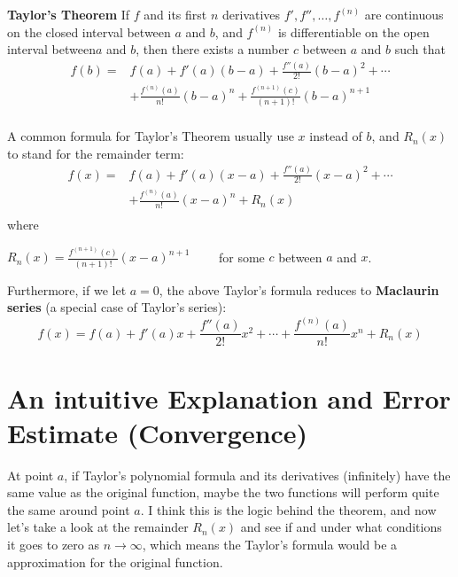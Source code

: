 \documentclass[11pt]{article}
\begin{document}
\begin{tcolorbox}[
	enhanced, 
	width=\textwidth, 
	fontupper=\normalsize,%
	drop fuzzy shadow southwest,
	boxrule=0.4pt,
	sharp corners,
	colframe=yellow!80!black,
	colback=yellow!10]
	
\textbf{\color{RoyalBlue} Taylor's Theorem} If $f$ and its first $n$ derivatives $f', f'',  \dots , f^{(n)}$ are continuous on the closed interval between $a$ and $b$, and $f^{(n)}$ is differentiable on the open interval between$a$ and $b$,  then there exists a number $c$ between $a$ and $b$ such that
$$
\begin{aligned}
f(b) =& f(a) + f'(a)(b-a) + \frac{f''(a)}{2!}(b-a)^2 + \cdots \\
&+ \frac{f^{(n)}(a)}{n!}(b-a)^n + \frac{f^{(n+1)}(c)}{(n+1)!}(b-a)^{n+1} \\
\end{aligned}
$$

\end{tcolorbox}


A common formula for Taylor's Theorem usually use $x$ instead of $b$,  and $R_n(x)$ to stand for the remainder term:
$$
\begin{aligned}
f(x) =& f(a) + f'(a)(x-a) + \frac{f''(a)}{2!}(x-a)^2 + \cdots \\
&+ \frac{f^{(n)}(a)}{n!}(x-a)^n + R_n(x) \\
\end{aligned}
$$
where
\begin{center}
$\displaystyle  R_n(x) = \frac{f^{(n+1)}(c)}{(n+1)!}(x-a)^{n+1} $  \ \ \ \ for some $c$ between $a$ and $x$.
\end{center}

Furthermore,  if we let $a=0$,  the above Taylor's formula reduces to \textbf{Maclaurin series} (a special case of Taylor's series):
$$
f(x) = f(a) + f'(a)x + \frac{f''(a)}{2!}x^2 + \cdots + \frac{f^{(n)}(a)}{n!}x^n + R_n(x)
$$





\section {\large An intuitive Explanation and Error Estimate (Convergence)}

At point $a$,  if Taylor's polynomial formula and its derivatives (infinitely) have the same value as the original function,  maybe the two functions will perform quite the same around point $a$.   I think this is the logic behind the theorem,  and now let's take a look at the remainder $R_n(x)$ and see if and under what conditions it goes to zero as $n \to \infty$,  which means the Taylor's formula would be a  approximation for the original function.
\end{document}
